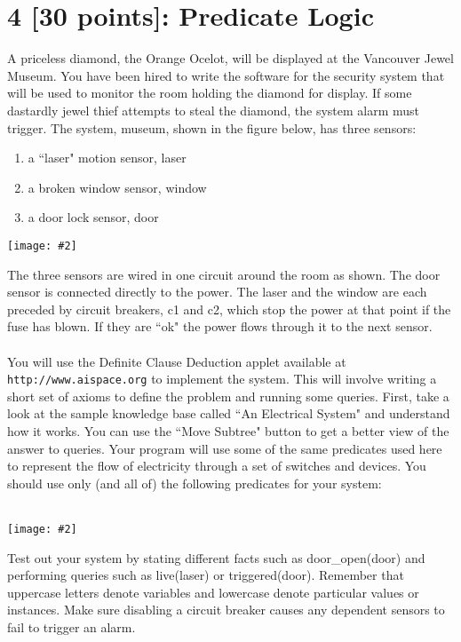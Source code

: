 \documentclass{article}
\newcommand{\centerfig}[2]{\begin{center}\texttt{[image: \#2]}\end{center}}
\begin{document}
\section{4 [30 points]: Predicate Logic}
A priceless diamond, the Orange Ocelot, will be displayed at the Vancouver Jewel Museum. You have been hired to write the software for the security system that will be used to monitor the room holding the diamond for display. If some dastardly jewel thief attempts to steal the diamond, the system alarm must trigger. The system, museum, shown in the figure below, has three sensors:
\begin{enumerate}
    \item a “laser" motion sensor, laser
    \item a broken window sensor, window
    \item a door lock sensor, door
\end{enumerate}
\centerfig{0.7}{../figs/fig3.png}
The three sensors are wired in one circuit around the room as shown. The door sensor is connected directly to the power. The laser and the window are each preceded by circuit breakers, c1 and c2, which stop the power at that point if the fuse has blown. If they are “ok" the power flows through it to the next sensor. \\ \\
You will use the Definite Clause Deduction applet available at \texttt{http://www.aispace.org} to implement the system. This will involve writing a short set of axioms to define the problem and running some queries. First, take a look at the sample knowledge base called “An Electrical System" and understand how it works. You can use the “Move Subtree" button to get a better view of the answer to queries. Your program will use some of the same predicates used here to represent the flow of electricity through a set of switches and devices. You should use only (and all of) the following predicates for your system: \\ \\
\centerfig{0.7}{../figs/fig4.png}
Test out your system by stating different facts such as door\_open(door) and performing queries such as live(laser) or triggered(door). Remember that uppercase letters denote variables and lowercase denote particular values or instances. Make sure disabling a circuit breaker causes any dependent sensors to fail to trigger an alarm. \\ \\
\end{document}
